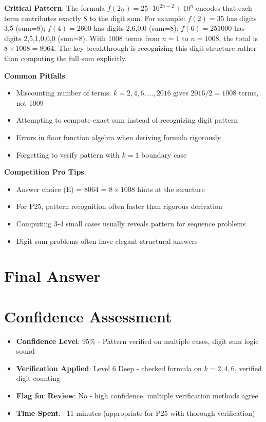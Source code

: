 \documentclass[]{article}
\begin{document}
\begin{keyinsightbox}
\textbf{Critical Pattern}: The formula $f(2n) = 25 \cdot 10^{2n-2} + 10^n$ encodes that each term contributes exactly 8 to the digit sum. For example: $f(2)=35$ has digits 3,5 (sum=8); $f(4)=2600$ has digits 2,6,0,0 (sum=8); $f(6)=251000$ has digits 2,5,1,0,0,0 (sum=8). With 1008 terms from $n=1$ to $n=1008$, the total is $8 \times 1008 = 8064$. The key breakthrough is recognizing this digit structure rather than computing the full sum explicitly.
\end{keyinsightbox}

\begin{warningbox}
\textbf{Common Pitfalls}:
\begin{itemize}
    \item Miscounting number of terms: $k = 2, 4, 6, \ldots, 2016$ gives $2016/2 = 1008$ terms, not 1009
    \item Attempting to compute exact sum instead of recognizing digit pattern
    \item Errors in floor function algebra when deriving formula rigorously
    \item Forgetting to verify pattern with $k=1$ boundary case
\end{itemize}
\end{warningbox}

\begin{tipbox}
\textbf{Competition Pro Tips}:
\begin{itemize}
    \item Answer choice (E) = 8064 = $8 \times 1008$ hints at the structure
    \item For P25, pattern recognition often faster than rigorous derivation
    \item Computing 3-4 small cases usually reveals pattern for sequence problems
    \item Digit sum problems often have elegant structural answers
\end{itemize}
\end{tipbox}

\section*{Final Answer}

\section*{Confidence Assessment}
\begin{itemize}[leftmargin=*]
    \item \textbf{Confidence Level}: 95\% - Pattern verified on multiple cases, digit sum logic sound
    \item \textbf{Verification Applied}: Level 6 Deep - checked formula on $k=2,4,6$, verified digit counting
    \item \textbf{Flag for Review}: No - high confidence, multiple verification methods agree
    \item \textbf{Time Spent}: ~11 minutes (appropriate for P25 with thorough verification)
\end{itemize}
\end{document}
